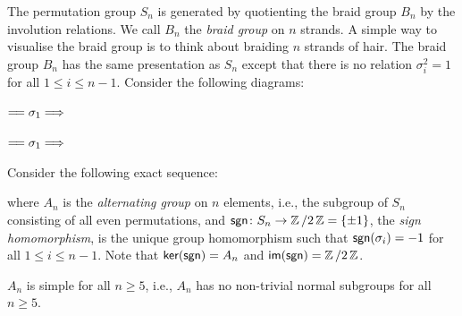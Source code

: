 The permutation group $S_n$ is generated by quotienting the braid group $B_n$ by the involution relations. We call $B_n$ the \emph{braid group} on $n$ strands. A simple way to visualise the braid group is to think about braiding $n$ strands of hair. The braid group $B_n$ has the same presentation as $S_n$ except that there is no relation $\sigma_i^2 = 1$ for all $1 \leq i \leq n - 1$. Consider the following diagrams:
\begin{center}
  \qquad
  $=\joinrel= \sigma_1 \Longrightarrow$
  \qquad
  \qquad
  $=\joinrel= \sigma_1 \Longrightarrow$
  \qquad
\end{center}

Consider the following exact sequence:
\begin{center}
\end{center}
where $A_n$ is the \emph{alternating group} on $n$ elements, i.e., the subgroup of $S_n$ consisting of all even permutations, and $\operatorname{\text{\normalfont\sffamily sgn}} \colon S_n \to \operatorname{\mathbb{Z}} \mathbin{/} 2\operatorname{\mathbb{Z}} = \{ \pm 1 \}$, the \emph{sign homomorphism}, is the unique group homomorphism such that $\operatorname{\text{\normalfont\sffamily sgn}}(\sigma_i) = -1$ for all $1 \leq i \leq n - 1$. Note that $\operatorname{\text{\normalfont\sffamily ker}}(\operatorname{\text{\normalfont\sffamily sgn}}) = A_n$ and $\operatorname{\text{\normalfont\sffamily im}}(\operatorname{\text{\normalfont\sffamily sgn}}) = \operatorname{\mathbb{Z}} \mathbin{/} 2\operatorname{\mathbb{Z}}$.
\begin{remark}
  $A_n$ is simple for all $n \geq 5$, i.e., $A_n$ has no non-trivial normal subgroups for all $n \geq 5$.
\end{remark}

